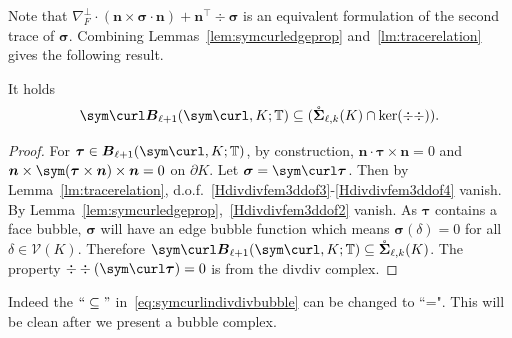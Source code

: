 Note that $ \nabla_F^{\bot}\cdot(\boldsymbol n\times\boldsymbol \sigma\cdot\boldsymbol n)+\boldsymbol  n^{\intercal} \div\boldsymbol \sigma$ is an equivalent formulation of the second trace of $\boldsymbol \sigma$. 
%
Combining Lemmas~\ref{lem:symcurledgeprop} and~\ref{lm:tracerelation} gives the following result.
\begin{lemma}\label{lm:symbubble}
It holds
\begin{equation}\label{eq:symcurlindivdivbubble}
\sym\curl \boldsymbol B_{\ell+1}(\sym\curl, K;\mathbb T) \subseteq (\mathring{\boldsymbol \Sigma}_{\ell,k}(K)\cap\ker(\div\div)).
\end{equation}
\end{lemma}
\begin{proof}
For $\boldsymbol \tau \in \boldsymbol B_{\ell+1}(\sym\curl, K;\mathbb T)$, by construction, $\boldsymbol n\cdot \boldsymbol \tau\times\boldsymbol n = 0$ and $\boldsymbol n\times \sym(\boldsymbol\tau\times\boldsymbol n)\times\boldsymbol n = 0$ on $\partial K$. Let $\boldsymbol \sigma = \sym \curl \boldsymbol \tau$. Then by Lemma~\ref{lm:tracerelation}, d.o.f.~\eqref{Hdivdivfem3ddof3}-\eqref{Hdivdivfem3ddof4} vanish. By Lemma~\ref{lem:symcurledgeprop},~\eqref{Hdivdivfem3ddof2} vanish. As $\boldsymbol \tau$ contains a face bubble, $\boldsymbol \sigma$  will have an  edge bubble function which means $\boldsymbol \sigma(\delta) = 0$ for all $\delta \in \mathcal V(K)$. Therefore  $\sym\curl \boldsymbol B_{\ell+1}(\sym\curl, K;\mathbb T) \subseteq \mathring{\boldsymbol \Sigma}_{\ell,k}(K)$. The property $\div\div (\sym \curl \boldsymbol \tau) = 0$ is from the divdiv complex.
\end{proof}

Indeed the $``\subseteq"$  in~\eqref{eq:symcurlindivdivbubble} can be changed to ``=". This will be clean after we present a bubble complex. 

